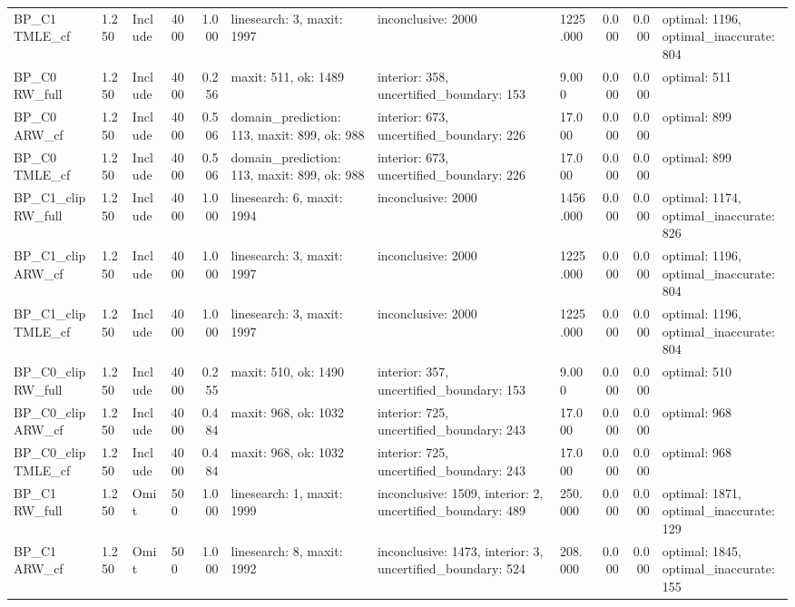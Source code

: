 \begin{tabular}{llllrlllrrl}
BP\_C1 TMLE\_cf & 1.250 & Include & 4000 & 1.000 & linesearch: 3, maxit: 1997 & inconclusive: 2000 & 1225.000 & 0.000 & 0.000 & optimal: 1196, optimal\_inaccurate: 804 \\
BP\_C0 RW\_full & 1.250 & Include & 4000 & 0.256 & maxit: 511, ok: 1489 & interior: 358, uncertified\_boundary: 153 & 9.000 & 0.000 & 0.000 & optimal: 511 \\
BP\_C0 ARW\_cf & 1.250 & Include & 4000 & 0.506 & domain\_prediction: 113, maxit: 899, ok: 988 & interior: 673, uncertified\_boundary: 226 & 17.000 & 0.000 & 0.000 & optimal: 899 \\
BP\_C0 TMLE\_cf & 1.250 & Include & 4000 & 0.506 & domain\_prediction: 113, maxit: 899, ok: 988 & interior: 673, uncertified\_boundary: 226 & 17.000 & 0.000 & 0.000 & optimal: 899 \\
BP\_C1\_clip RW\_full & 1.250 & Include & 4000 & 1.000 & linesearch: 6, maxit: 1994 & inconclusive: 2000 & 1456.000 & 0.000 & 0.000 & optimal: 1174, optimal\_inaccurate: 826 \\
BP\_C1\_clip ARW\_cf & 1.250 & Include & 4000 & 1.000 & linesearch: 3, maxit: 1997 & inconclusive: 2000 & 1225.000 & 0.000 & 0.000 & optimal: 1196, optimal\_inaccurate: 804 \\
BP\_C1\_clip TMLE\_cf & 1.250 & Include & 4000 & 1.000 & linesearch: 3, maxit: 1997 & inconclusive: 2000 & 1225.000 & 0.000 & 0.000 & optimal: 1196, optimal\_inaccurate: 804 \\
BP\_C0\_clip RW\_full & 1.250 & Include & 4000 & 0.255 & maxit: 510, ok: 1490 & interior: 357, uncertified\_boundary: 153 & 9.000 & 0.000 & 0.000 & optimal: 510 \\
BP\_C0\_clip ARW\_cf & 1.250 & Include & 4000 & 0.484 & maxit: 968, ok: 1032 & interior: 725, uncertified\_boundary: 243 & 17.000 & 0.000 & 0.000 & optimal: 968 \\
BP\_C0\_clip TMLE\_cf & 1.250 & Include & 4000 & 0.484 & maxit: 968, ok: 1032 & interior: 725, uncertified\_boundary: 243 & 17.000 & 0.000 & 0.000 & optimal: 968 \\
BP\_C1 RW\_full & 1.250 & Omit & 500 & 1.000 & linesearch: 1, maxit: 1999 & inconclusive: 1509, interior: 2, uncertified\_boundary: 489 & 250.000 & 0.000 & 0.000 & optimal: 1871, optimal\_inaccurate: 129 \\
BP\_C1 ARW\_cf & 1.250 & Omit & 500 & 1.000 & linesearch: 8, maxit: 1992 & inconclusive: 1473, interior: 3, uncertified\_boundary: 524 & 208.000 & 0.000 & 0.000 & optimal: 1845, optimal\_inaccurate: 155 \\

\end{tabular}
